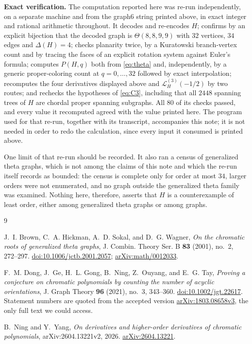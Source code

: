 \documentclass[11pt]{amsart}
\theoremstyle{remark}
\newcommand{\Lfun}{\mathcal L}
\newcommand{\ThetaG}{\Theta}
\begin{document}
\medskip
\noindent\textbf{Exact verification.}
The computation reported here was re-run independently, on a separate machine
and from the graph6 string printed above, in exact integer and rational
arithmetic throughout. It decodes and re-encodes
$H$; confirms by an explicit bijection that the decoded graph is
$\ThetaG(8,8,9,9)$ with $32$ vertices, $34$ edges and $\Delta(H)=4$; checks
planarity twice, by a Kuratowski branch-vertex count and by tracing the faces
of an explicit rotation system against Euler's formula; computes $P(H,q)$ both
from \eqref{eq:theta} and, independently, by a generic proper-coloring count at
$q=0,\ldots,32$ followed by exact interpolation; recomputes the four
derivatives displayed above and $\Lfun_H^{(3)}(-1/2)$ by two routes; and
rechecks the hypotheses of \eqref{eq:C3}, including that all $2448$ spanning
trees of $H$ are chordal proper spanning subgraphs. All $80$ of its checks
passed, and every value it recomputed agreed with the value printed here. The
program used for that re-run, together with its transcript, accompanies this
note; it is not needed in order to redo the calculation, since every input it
consumed is printed above.

One limit of that re-run should be recorded. It also ran a census of
generalized theta graphs, which is not among the claims of this note and which
the re-run itself records as bounded: the census is complete only for order at
most $34$, larger orders were not enumerated, and no graph outside the generalized
theta family was examined. Nothing here, therefore, asserts that $H$ is a
counterexample of least order, either among generalized theta graphs or among
graphs.

\begin{thebibliography}{9}

J.~I. Brown, C.~A. Hickman, A.~D. Sokal, and D.~G. Wagner,
\emph{On the chromatic roots of generalized theta graphs},
J. Combin. Theory Ser. B \textbf{83} (2001), no.~2, 272--297.
\href{https://doi.org/10.1006/jctb.2001.2057}{doi:10.1006/jctb.2001.2057};
\href{https://arxiv.org/abs/math/0012033}{arXiv:math/0012033}.

F.~M. Dong, J.~Ge, H.~L. Gong, B.~Ning, Z.~Ouyang, and E.~G. Tay,
\emph{Proving a conjecture on chromatic polynomials by counting the number of
acyclic orientations},
J. Graph Theory \textbf{96} (2021), no.~3, 343--360.
\href{https://doi.org/10.1002/jgt.22617}{doi:10.1002/jgt.22617}.
Statement numbers are quoted from the accepted version
\href{https://arxiv.org/abs/1803.08658v3}{arXiv:1803.08658v3}, the only full
text we could access.

B.~Ning and Y.~Yang,
\emph{On derivatives and higher-order derivatives of chromatic polynomials},
arXiv:2604.13221v2, 2026.
\href{https://arxiv.org/abs/2604.13221}{arXiv:2604.13221}.

\end{thebibliography}
\end{document}
